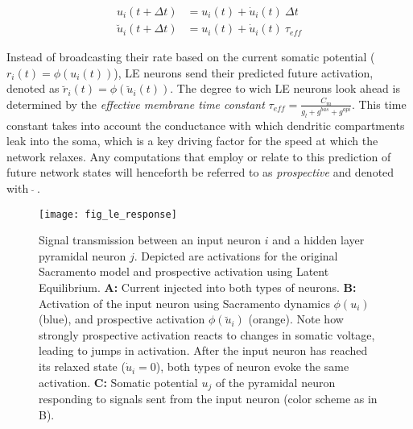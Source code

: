 \begin{align}
  u_i(t+ \Delta t)          & = u_i(t) + \dot{u}_i(t) \ \Delta t \label{eq-r-t-sacramento} \\
  \breve{u}_i(t + \Delta t) & = u_i(t) + \dot{u}_i(t) \ \tau_{eff} \label{eq-r-t-haider}
\end{align}

Instead of broadcasting their rate based on the current somatic potential ($r_i(t) = \phi(u_i(t))$), LE neurons send
their predicted future activation, denoted as $\breve{r}_i(t) = \phi(\breve{u}_i(t))$. The degree to wich LE neurons
look ahead is determined by the \textit{effective membrane time constant} $\tau_{eff} = \frac{C_m}{g_l + g^{bas} +
g^{api}}$. This time constant takes into account the conductance with which dendritic compartments leak into the soma,
which is a key driving factor for the speed at which the network relaxes. Any computations that employ or relate to this
prediction of future network states will henceforth be referred to as \textit{prospective} and denoted with $\ \breve{}
\ $.

\begin{figure}[h!]
  \centering
  \texttt{[image: fig\_le\_response]}
  \caption{Signal transmission between an input neuron $i$ and a hidden layer pyramidal neuron $j$. Depicted are
    activations for the original Sacramento model and prospective activation using Latent Equilibrium. \textbf{A:}
    Current injected into both types of neurons. \textbf{B:} Activation of the input neuron using Sacramento dynamics
    $\phi(u_i)$ (blue), and prospective activation $\phi(\breve{u}_i)$ (orange). Note how strongly prospective
    activation reacts to changes in somatic voltage, leading to jumps in activation. After the input neuron has reached
    its relaxed state ($\dot{u}_i = 0$), both types of neuron evoke the same activation. \textbf{C:} Somatic potential
    $u_j$ of the pyramidal neuron responding to signals sent from the input neuron (color scheme as in B).}
  \label{fig-comparison-le}
\end{figure}

